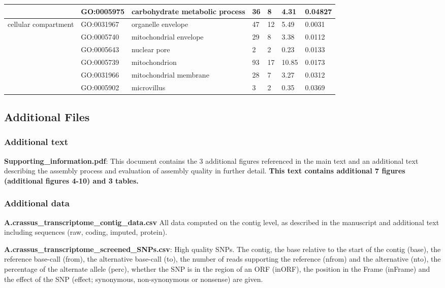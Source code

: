 \documentclass[10pt]{bmc_article}
\newenvironment{bmcformat}{\begin{raggedright}\baselineskip20pt\sloppy\setboolean{publ}{false}}{\end{raggedright}\baselineskip20pt\sloppy}
\begin{document}
\begin{bmcformat}
\begin{longtable}{p{1.7cm}lp{4.5cm}p{1cm}p{1cm}ll}
   & GO:0005975 & carbohydrate metabolic process &  36 &   8 & 4.31 & 0.04827 \\ 
   \hline
cellular compartment & GO:0031967 & organelle envelope &  47 &  12 & 5.49 & 0.0031 \\ 
   & GO:0005740 & mitochondrial envelope &  29 &   8 & 3.38 & 0.0112 \\ 
   & GO:0005643 & nuclear pore &   2 &   2 & 0.23 & 0.0133 \\ 
   & GO:0005739 & mitochondrion &  93 &  17 & 10.85 & 0.0173 \\ 
   & GO:0031966 & mitochondrial membrane &  28 &   7 & 3.27 & 0.0312 \\ 
   & GO:0005902 & microvillus &   3 &   2 & 0.35 & 0.0369 \\ 
   \hline
\hline
\end{longtable}
\normalsize


\subsection*{Additional Files}

\subsubsection*{Additional text}

\textbf{Supporting\_information.pdf}: This document contains the 3
additional figures referenced in the main text and an additional text
describing the assembly process and evaluation of assembly quality in
further detail. \textbf{This text contains additional 7 figures
  (additional figures 4-10) and 3 tables.}

\subsubsection*{Additional data}

\textbf{A.crassus\_transcriptome\_contig\_data.csv} All data computed
on the contig level, as described in the manuscript and additional
text including sequences (raw, coding, imputed, protein).

\textbf{A.crassus\_transcriptome\_screened\_SNPs.csv}: High quality
SNPs. The contig, the base relative to the start of the contig (base),
the reference base-call (from), the alternative base-call (to), the
number of reads supporting the reference (nfrom) and the alternative
(nto), the percentage of the alternate allele (perc), whether the SNP
is in the region of an ORF (inORF), the position in the Frame
(inFrame) and the effect of the SNP (effect; synonymous,
non-synonymous or nonsense) are given.


\end{bmcformat}
\end{document}

